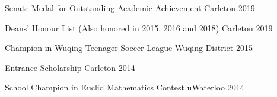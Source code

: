 
\begin{cvhonors}

\cvaward
{Senate Medal for Outstanding Academic Achievement}
{Carleton}
{2019}

\cvaward
{Deans' Honour List (Also honored in 2015, 2016 and 2018)}
{Carleton}
{2019}

\cvaward
{Champion in Wuqing Teenager Soccer League}
{Wuqing District}
{2015}

\cvaward
{Entrance Scholarship}
{Carleton}
{2014}

\cvaward
{School Champion in Euclid Mathematics Contest}
{uWaterloo}
{2014}



\end{cvhonors}


%
%
%
%
